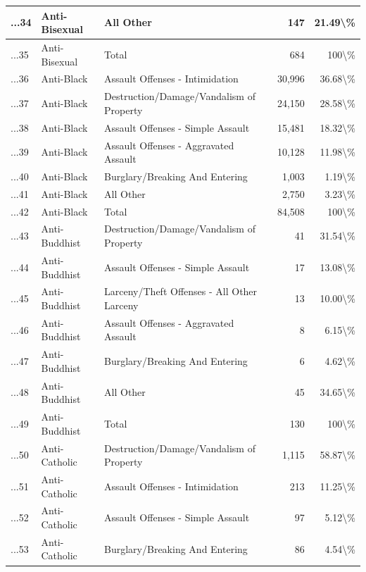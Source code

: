 \documentclass[
]{krantz}
\begin{document}
\begin{longtable}[t]{l|l|l|r|r}
\hline
...34 & Anti-Bisexual & All Other & 147 & 21.49\textbackslash{}\%\\
\hline
...35 & Anti-Bisexual & Total & 684 & 100\textbackslash{}\%\\
\hline
...36 & Anti-Black & Assault Offenses - Intimidation & 30,996 & 36.68\textbackslash{}\%\\
\hline
...37 & Anti-Black & Destruction/Damage/Vandalism of Property & 24,150 & 28.58\textbackslash{}\%\\
\hline
...38 & Anti-Black & Assault Offenses - Simple Assault & 15,481 & 18.32\textbackslash{}\%\\
\hline
...39 & Anti-Black & Assault Offenses - Aggravated Assault & 10,128 & 11.98\textbackslash{}\%\\
\hline
...40 & Anti-Black & Burglary/Breaking And Entering & 1,003 & 1.19\textbackslash{}\%\\
\hline
...41 & Anti-Black & All Other & 2,750 & 3.23\textbackslash{}\%\\
\hline
...42 & Anti-Black & Total & 84,508 & 100\textbackslash{}\%\\
\hline
...43 & Anti-Buddhist & Destruction/Damage/Vandalism of Property & 41 & 31.54\textbackslash{}\%\\
\hline
...44 & Anti-Buddhist & Assault Offenses - Simple Assault & 17 & 13.08\textbackslash{}\%\\
\hline
...45 & Anti-Buddhist & Larceny/Theft Offenses - All Other Larceny & 13 & 10.00\textbackslash{}\%\\
\hline
...46 & Anti-Buddhist & Assault Offenses - Aggravated Assault & 8 & 6.15\textbackslash{}\%\\
\hline
...47 & Anti-Buddhist & Burglary/Breaking And Entering & 6 & 4.62\textbackslash{}\%\\
\hline
...48 & Anti-Buddhist & All Other & 45 & 34.65\textbackslash{}\%\\
\hline
...49 & Anti-Buddhist & Total & 130 & 100\textbackslash{}\%\\
\hline
...50 & Anti-Catholic & Destruction/Damage/Vandalism of Property & 1,115 & 58.87\textbackslash{}\%\\
\hline
...51 & Anti-Catholic & Assault Offenses - Intimidation & 213 & 11.25\textbackslash{}\%\\
\hline
...52 & Anti-Catholic & Assault Offenses - Simple Assault & 97 & 5.12\textbackslash{}\%\\
\hline
...53 & Anti-Catholic & Burglary/Breaking And Entering & 86 & 4.54\textbackslash{}\%\\

\end{longtable}
\end{document}
